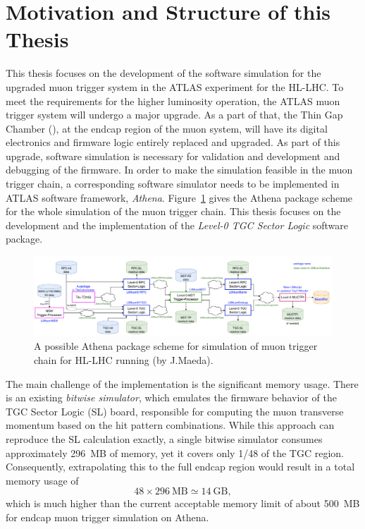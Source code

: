 \section{Motivation and Structure of this Thesis} \label{sec:motivation}
This thesis focuses on the development of the software simulation for the upgraded muon trigger system in the ATLAS experiment for the HL-LHC. To meet the requirements for the higher luminosity operation, the ATLAS muon trigger system will undergo a major upgrade. As a part of that, the Thin Gap Chamber (\TGC), at the endcap region of the muon system, will have its digital electronics and firmware logic entirely replaced and upgraded. As part of this upgrade, software simulation is necessary for validation and development and debugging of the firmware. In order to make the simulation feasible in the muon trigger chain, a corresponding software simulator needs to be implemented in ATLAS software framework, \textit{Athena}. Figure~\ref{fig:L0_trigger_chain} gives the Athena package scheme for the whole simulation of the muon trigger chain. This thesis focuses on the development and the implementation of the \textit{Level-0 TGC Sector Logic} software package.

\begin{figure}[htbp]
  \centering
  \includegraphics[width=1.0\textwidth]{figs/chapter1/L0_trigger_chain.png}
  \caption{A possible Athena package scheme for simulation of muon trigger chain for HL-LHC running (by J.Maeda).}
  \label{fig:L0_trigger_chain}
\end{figure}

The main challenge of the implementation is the significant memory usage. There is an existing \textit{bitwise simulator}, which emulates the firmware behavior of the TGC Sector Logic (SL) board, responsible for computing the muon transverse momentum based on the hit pattern combinations. While this approach can reproduce the SL calculation exactly, a single bitwise simulator consumes approximately 296~MB of memory, yet it covers only 1/48 of the TGC region. Consequently, extrapolating this to the full endcap region would result in a total memory usage of
\[
48 \times 296~\text{MB} \simeq 14~\text{GB},
\]
which is much higher than the current acceptable memory limit of about 500~MB for endcap muon trigger simulation on Athena.

